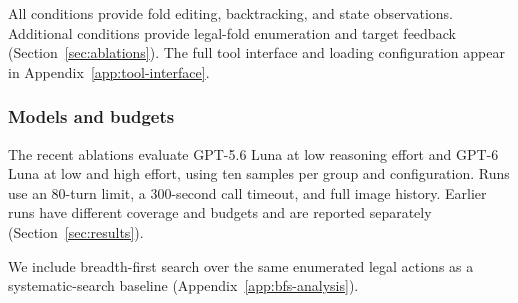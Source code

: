\label{sec:exp-tools}
All conditions provide fold editing, backtracking, and state observations. Additional
conditions provide legal-fold enumeration and target feedback
(Section~\ref{sec:ablations}). The full tool interface and loading configuration
appear in Appendix~\ref{app:tool-interface}.


\subsubsection{Models and budgets}
\label{sec:exp-protocol}

The recent ablations evaluate GPT-5.6 Luna at low reasoning effort and GPT-6 Luna
at low and high effort, using ten samples per group and configuration. Runs use an
80-turn limit, a 300-second call timeout, and full image history. Earlier runs have
different coverage and budgets and are reported separately (Section~\ref{sec:results}).

We include breadth-first search over the same enumerated legal actions as a
systematic-search baseline (Appendix~\ref{app:bfs-analysis}).
